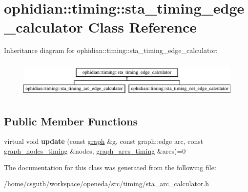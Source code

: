 \hypertarget{classophidian_1_1timing_1_1sta__timing__edge__calculator}{\section{ophidian\-:\-:timing\-:\-:sta\-\_\-timing\-\_\-edge\-\_\-calculator Class Reference}
\label{classophidian_1_1timing_1_1sta__timing__edge__calculator}
}
Inheritance diagram for ophidian\-:\-:timing\-:\-:sta\-\_\-timing\-\_\-edge\-\_\-calculator\-:\begin{figure}[H]
\begin{center}
\leavevmode
\includegraphics[height=1.924399cm]{classophidian_1_1timing_1_1sta__timing__edge__calculator}
\end{center}
\end{figure}
\subsection*{Public Member Functions}
\begin{DoxyCompactItemize}
\item 
\hypertarget{classophidian_1_1timing_1_1sta__timing__edge__calculator_a1621f0c51ed5b6a9ffcc9456a10d1645}{virtual void {\bfseries update} (const \hyperlink{classophidian_1_1timing_1_1graph}{graph} \&g, const graph\-::edge arc, const \hyperlink{classophidian_1_1timing_1_1graph__nodes__timing}{graph\-\_\-nodes\-\_\-timing} \&nodes, \hyperlink{classophidian_1_1timing_1_1graph__arcs__timing}{graph\-\_\-arcs\-\_\-timing} \&arcs)=0}\label{classophidian_1_1timing_1_1sta__timing__edge__calculator_a1621f0c51ed5b6a9ffcc9456a10d1645}

\end{DoxyCompactItemize}


The documentation for this class was generated from the following file\-:\begin{DoxyCompactItemize}
\item 
/home/csguth/workspace/openeda/src/timing/sta\-\_\-arc\-\_\-calculator.\-h\end{DoxyCompactItemize}
